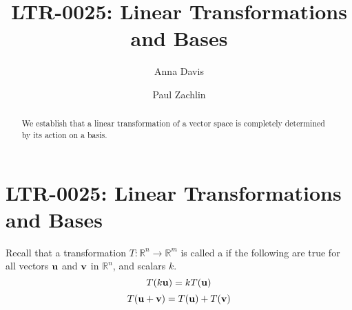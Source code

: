 \documentclass{ximera}
\author{Anna Davis \and Paul Zachlin} \title{LTR-0025: Linear Transformations and Bases} \license{CC-BY 4.0}
\begin{document}
\begin{abstract}
We establish that a linear transformation of a vector space is completely determined by its action on a basis. 
\end{abstract}
\maketitle

\section*{LTR-0025: Linear Transformations and Bases}

Recall that a transformation $T:\mathbb{R}^n\rightarrow \mathbb{R}^m$ is called a  if the following are true for all vectors ${\bf u}$ and ${\bf v}$ in $\mathbb{R}^n$, and scalars $k$.
\begin{equation*}
T(k{\bf u})= kT({\bf u})
\end{equation*}
\begin{equation*}
T({\bf u}+{\bf v})= T({\bf u})+T({\bf v})
\end{equation*}
\end{document}
